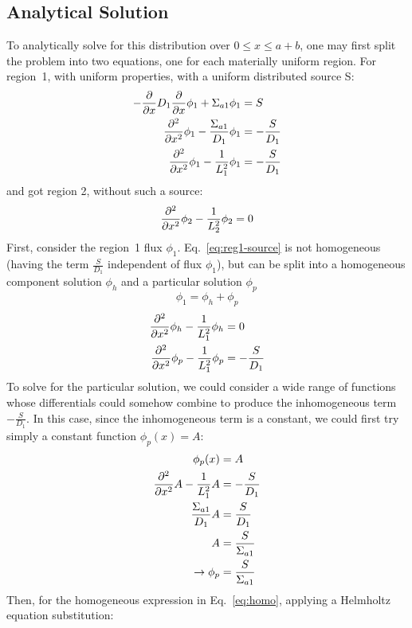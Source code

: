 \documentclass[12pt]{article}
\begin{document}
\subsection{Analytical Solution}
To analytically solve for this distribution over $0\leq x\leq a+b$, one may first split the problem into two equations, one for each materially uniform region.
For region~1, with uniform properties, with a uniform distributed source S:
\begin{align}
    -\frac{\partial}{\partial x} D_1\frac{\partial}{\partial x}\phi_1 + \Sigma_{a1}\phi_1 &= S \nonumber\\
    \frac{\partial^2}{\partial x^2}\phi_1 - \frac{\Sigma_{a1}}{D_1}\phi_1 &= -\frac{S}{D_1} \nonumber\\
    \label{eq:reg1-source}
    \frac{\partial^2}{\partial x^2}\phi_1 - \frac{1}{L_1^2}\phi_1 &= -\frac{S}{D_1}
\end{align}
and got region 2, without such a source:
\begin{equation}
    \label{eq:reg2}
    \frac{\partial^2}{\partial x^2}\phi_2 - \frac{1}{L_2^2}\phi_2 = 0
\end{equation}
First, consider the region~1 flux $\phi_1$.
Eq.~\ref{eq:reg1-source} is not homogeneous (having the term $\frac{S}{D_1}$ independent of flux $\phi_1$), but can be split into a homogeneous component solution $\phi_h$ and a particular solution $\phi_p$
\begin{equation}
    \label{eq:homo-part}
    \phi_1 = \phi_h + \phi_p
\end{equation}
\begin{align}
    \label{eq:homo}
    \frac{\partial^2}{\partial x^2} \phi_h - \frac{1}{L_1^2}\phi_h &= 0 \\
    \label{eq:partic}
    \frac{\partial^2}{\partial x^2} \phi_p - \frac{1}{L_1^2}\phi_p &= -\frac{S}{D_1}
\end{align}
To solve for the particular solution, we could consider a wide range of functions whose differentials could somehow combine to produce the inhomogeneous term $-\frac{S}{D_1}$.
In this case, since the inhomogeneous term is a constant, we could first try simply a constant function $\phi_p(x)=A$:
\begin{align}
    \phi_p(x)&=A\\
    \frac{\partial^2}{\partial x^2} A - \frac{1}{L_1^2}A &= -\frac{S}{D_1}\nonumber\\
    \frac{\Sigma_{a1}}{D_1}A &= \frac{S}{D_1}\nonumber\\
    A &= \frac{S}{\Sigma_{a1}}\\
    \label{eq:part-sol}
    \rightarrow\phi_p &= \frac{S}{\Sigma_{a1}}
\end{align}
Then, for the homogeneous expression in Eq.~\ref{eq:homo}, applying a Helmholtz equation substitution:
\end{document}
